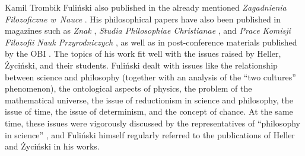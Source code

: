 \begin{artengenv}{Kamil Trombik}
Fuliński also published in the already mentioned \textit{Zagadnienia Filozoficzne w~Nauce} 
\parencites[][]{fulinski_profesor_2015}[][]{fulinski_fluktuujacy_2017}. %
 His philosophical papers have also been published in magazines such as \textit{Znak} 
\parencite[][]{fulinski_o_1993}, %
 \textit{Studia Philosophiae Christianae} 
\parencite[][]{fulinski_maszyna_1989}, %
 and \textit{Prace Komisji Filozofii Nauk Przyrodniczych} 
\parencite[][]{fulinski_czy_2010}, %
 as well as in post-conference materials published by the OBI 
\parencites[e.g.,][]{janik_glos_1990}[][]{heller_co_1991}[][]{heller_jednosc_2003-2}. %
 The topics of his work fit well with the issues raised by Heller, Życiński, and their students. Fuliński dealt with issues like the relationship between science and philosophy (together with an analysis of the ``two cultures'' phenomenon), the ontological aspects of physics, the problem of the mathematical universe, the issue of reductionism in science and philosophy, the issue of time, the issue of determinism, and the concept of chance. At the same time, these issues were vigorously discussed by the representatives of ``philosophy in science'' 
\parencite[e.g.,][pp.222–223]{trombik_koncepcje_2021}, %
 and Fuliński himself regularly referred to the publications of Heller and Życiński in his works.




\end{artengenv}
